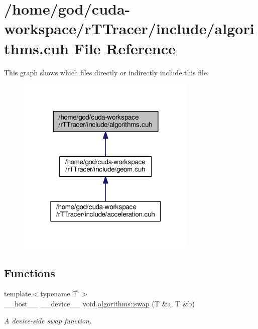 \hypertarget{r_t_tracer_2include_2algorithms_8cuh}{}\section{/home/god/cuda-\/workspace/r\+T\+Tracer/include/algorithms.cuh File Reference}
\label{r_t_tracer_2include_2algorithms_8cuh}
This graph shows which files directly or indirectly include this file\+:
\nopagebreak
\begin{figure}[H]
\begin{center}
\leavevmode
\includegraphics[width=244pt]{r_t_tracer_2include_2algorithms_8cuh__dep__incl}
\end{center}
\end{figure}
\subsection*{Functions}
\begin{DoxyCompactItemize}
\item 
{\footnotesize template$<$typename T $>$ }\\\+\_\+\+\_\+host\+\_\+\+\_\+ \+\_\+\+\_\+device\+\_\+\+\_\+ void \hyperlink{group__auxiliary__algorithms_ga8bffe5209ec351179a96aed81aab0978}{algorithms\+::swap} (T \&a, T \&b)
\begin{DoxyCompactList}\small\item\em A device-\/side swap function. \end{DoxyCompactList}\end{DoxyCompactItemize}
